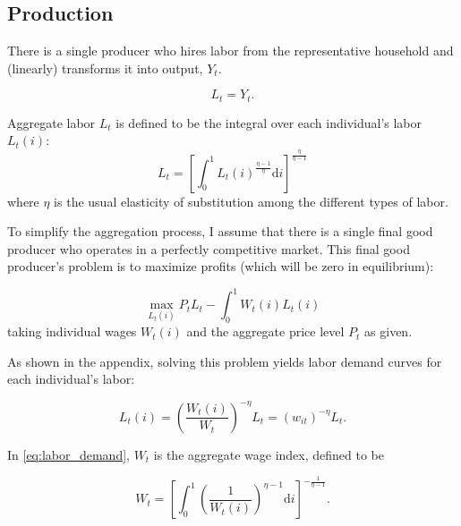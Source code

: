 \documentclass[12pt,a4paper]{scrartcl}            %
\begin{document}
\subsection{Production}
\label{sub:production}

There is a single producer who hires labor from the representative household and (linearly) transforms it into output, $Y_t$.

\begin{equation} \label{eq:agg_output}
    L_t = Y_t.
\end{equation}

Aggregate labor \(L_t\) is defined to be the integral over each individual's labor \(L_t(i)\):
%
\begin{equation} \label{eq:agg_labor}
    L_t = \left[ \int_0^1 L_t(i)^{\frac{\eta - 1}{\eta}} \mathrm{d}i \right]^{\frac{\eta}{\eta - 1}}
\end{equation}
%
where $\eta$ is the usual elasticity of substitution among the different types of labor.

To simplify the aggregation process, I assume that there is a single final good producer who operates in a perfectly competitive market.
This final good producer's problem is to maximize profits (which will be zero in equilibrium):

\begin{equation} \label{eq:firms_problem}
    \max_{L_t(i)} P_t L_t - \int_0^1 W_t(i)L_t(i)
\end{equation}
%
taking individual wages $W_t(i)$ and the aggregate price level $P_t$ as given.

As shown in the appendix, solving this problem yields labor demand curves for each individual's labor:

\begin{equation}
    \label{eq:labor_demand}
    L_t(i) = \left( \frac{W_t(i)}{W_t} \right)^{-\eta}L_t = (w_{it})^{-\eta}L_t.
\end{equation}

In \eqref{eq:labor_demand}, $W_t$ is the aggregate wage index, defined to be

\begin{equation} \label{eq:wage_index}
    W_t = \left[\int_{0}^{1}\left(\frac{1}{W_t(i)}\right)^{\eta - 1} \mathrm{d}i \right]^{-\frac{1}{\eta - 1}}.
\end{equation}
\end{document}
